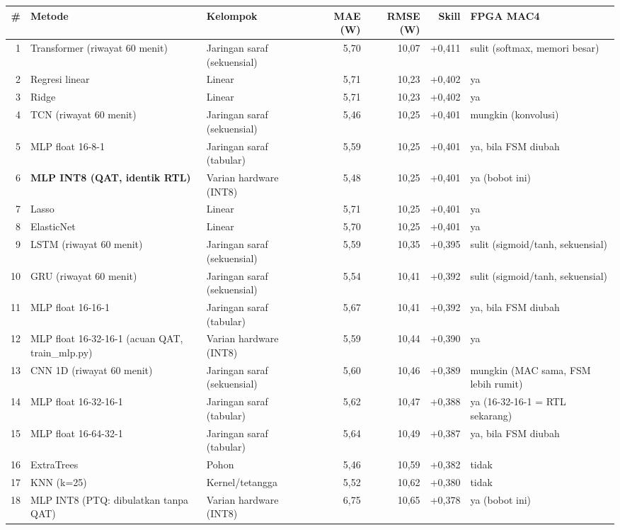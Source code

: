 \begin{small}
\begin{longtable}{@{}r p{6.2cm} p{3.4cm} r r r p{2.6cm}@{}}
\toprule
\# & Metode & Kelompok & MAE (W) & RMSE (W) & Skill & FPGA MAC4 \\ \midrule \endhead
1 & Transformer (riwayat 60 menit) & Jaringan saraf (sekuensial) & 5,70 & 10,07 & +0,411 & sulit (softmax, memori besar) \\
2 & Regresi linear & Linear & 5,71 & 10,23 & +0,402 & ya \\
3 & Ridge & Linear & 5,71 & 10,23 & +0,402 & ya \\
4 & TCN (riwayat 60 menit) & Jaringan saraf (sekuensial) & 5,46 & 10,25 & +0,401 & mungkin (konvolusi) \\
5 & MLP float 16-8-1 & Jaringan saraf (tabular) & 5,59 & 10,25 & +0,401 & ya, bila FSM diubah \\
6 & \textbf{MLP INT8 (QAT, identik RTL)} & Varian hardware (INT8) & 5,48 & 10,25 & +0,401 & ya (bobot ini) \\
7 & Lasso & Linear & 5,71 & 10,25 & +0,401 & ya \\
8 & ElasticNet & Linear & 5,70 & 10,25 & +0,401 & ya \\
9 & LSTM (riwayat 60 menit) & Jaringan saraf (sekuensial) & 5,59 & 10,35 & +0,395 & sulit (sigmoid/tanh, sekuensial) \\
10 & GRU (riwayat 60 menit) & Jaringan saraf (sekuensial) & 5,54 & 10,41 & +0,392 & sulit (sigmoid/tanh, sekuensial) \\
11 & MLP float 16-16-1 & Jaringan saraf (tabular) & 5,67 & 10,41 & +0,392 & ya, bila FSM diubah \\
12 & MLP float 16-32-16-1 (acuan QAT, train\_mlp.py) & Varian hardware (INT8) & 5,59 & 10,44 & +0,390 & ya \\
13 & CNN 1D (riwayat 60 menit) & Jaringan saraf (sekuensial) & 5,60 & 10,46 & +0,389 & mungkin (MAC sama, FSM lebih rumit) \\
14 & MLP float 16-32-16-1 & Jaringan saraf (tabular) & 5,62 & 10,47 & +0,388 & ya (16-32-16-1 = RTL sekarang) \\
15 & MLP float 16-64-32-1 & Jaringan saraf (tabular) & 5,64 & 10,49 & +0,387 & ya, bila FSM diubah \\
16 & ExtraTrees & Pohon & 5,46 & 10,59 & +0,382 & tidak \\
17 & KNN (k=25) & Kernel/tetangga & 5,52 & 10,62 & +0,380 & tidak \\
18 & MLP INT8 (PTQ: dibulatkan tanpa QAT) & Varian hardware (INT8) & 6,75 & 10,65 & +0,378 & ya (bobot ini) \\

\end{longtable}
\end{small}
